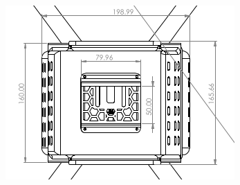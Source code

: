 \documentclass[12pt]{report}
\begin{document}
\begin{minipage}{0.3\textwidth}
    \centering
    \includegraphics[width=\linewidth]{hub2.png}
\end{minipage}
\end{document}
